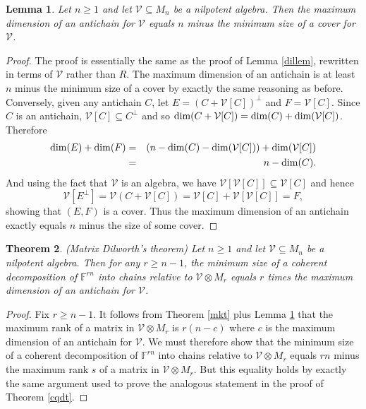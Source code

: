 \documentclass{amsart}
\newtheorem{thm}{Theorem}[section]
\newtheorem{lem}[thm]{Lemma}
\theoremstyle{definition}
\begin{document}
\begin{lem}\label{dillem2}
Let $n \geq 1$ and let $\mathcal{V} \subseteq M_n$ be a nilpotent algebra. Then the maximum dimension of an antichain for $\mathcal{V}$ equals $n$ minus the minimum size of a cover for $\mathcal{V}$.
\end{lem}

\begin{proof}
The proof is essentially the same as the proof of Lemma \ref{dillem}, rewritten in terms of $\mathcal{V}$ rather than $R$. The maximum dimension of an antichain is at least $n$ minus the minimum size of a cover by exactly the same reasoning as before. Conversely, given any antichain $C$, let $E = (C + \mathcal{V}[C])^\perp$ and $F = \mathcal{V}[C]$. Since $C$ is an antichain, $\mathcal{V}[C] \subseteq C^\perp$ and so ${\rm dim}(C + \mathcal{V}[C]) = {\rm dim}(C) + {\rm dim}(\mathcal{V}[C])$. Therefore \begin{eqnarray*}
{\rm dim}(E) + {\rm dim}(F) &=& (n - {\rm dim}(C) - {\rm dim}(\mathcal{V}[C])) + {\rm dim}(\mathcal{V}[C])\\ &=& n - {\rm dim}(C).
\end{eqnarray*} And using the fact that $\mathcal{V}$ is an algebra, we have $\mathcal{V}[\mathcal{V}[C]] \subseteq \mathcal{V}[C]$ and hence $$\mathcal{V}[E^\perp] = \mathcal{V}(C + \mathcal{V}[C]) = \mathcal{V}[C] + \mathcal{V}[\mathcal{V}[C]] = F,$$ showing that $(E,F)$ is a cover. Thus the maximum dimension of an antichain exactly equals $n$ minus the size of some cover.
\end{proof}

\begin{thm} (Matrix Dilworth's theorem)
Let $n \geq 1$ and let $\mathcal{V} \subseteq M_n$ be a nilpotent algebra. Then for any $r \geq n - 1$, the minimum size of a coherent decomposition of $\mathbb{F}^{rn}$ into chains relative to $\mathcal{V} \otimes M_r$ equals $r$ times the maximum dimension of an antichain for $\mathcal{V}$.
\end{thm}

\begin{proof}
Fix $r \geq n - 1$. It follows from Theorem \ref{mkt} plus Lemma \ref{dillem2} that the maximum rank of a matrix in $\mathcal{V}\otimes M_r$ is $r(n - c)$ where $c$ is the maximum dimension of an antichain for $\mathcal{V}$. We must therefore show that the minimum size of a coherent decomposition of $\mathbb{F}^{rn}$ into chains relative to $\mathcal{V} \otimes M_r$ equals $rn$ minus the maximum rank $s$ of a matrix in $\mathcal{V}\otimes M_r$. But this equality holds by exactly the same argument used to prove the analogous statement in the proof of Theorem \ref{cqdt}.
\end{proof}
\end{document}
